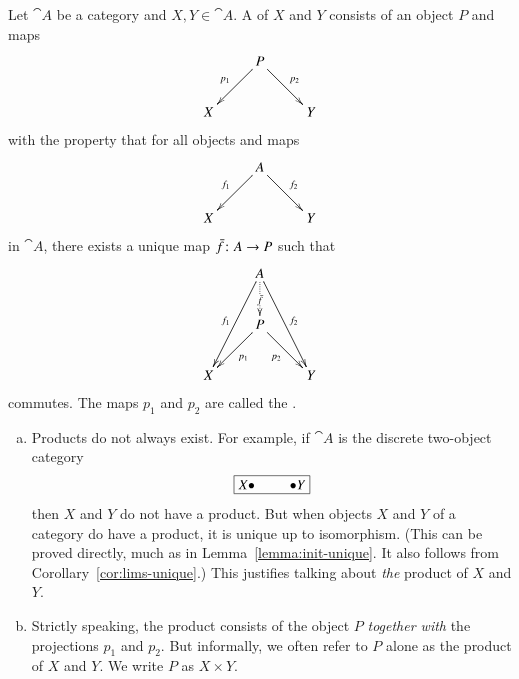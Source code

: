 \begin{defn}
\label{defn:bin-prod}
Let $\cat{A}$ be a category and $X, Y \in \cat{A}$.  A %
%
%
of $X$ and $Y$ consists of an object $P$ and maps
\[
\xymatrix{
        &P \ar[ld]_{p_1} \ar[rd]^{p_2}  &       \\
X       &                               &Y
}
\]
with the property that for all objects and maps
%
\begin{equation}
\label{eq:bin-prod-cone}
\begin{array}{c}
\xymatrix{
        &A \ar[ld]_{f_1} \ar[rd]^{f_2}  &       \\
X       &                               &Y
}
\end{array}
\end{equation}
%
in $\cat{A}$, there exists a unique map $\bar{f}\from A \to P$ such that
%
\begin{equation}
\label{eq:bin-prod-lim}
\begin{array}{c}
\xymatrix{
        &A \ar[ldd]_{f_1} \ar@{.>}[d]|{\bar{f}\vphantom{\bar{\bar{f}}}}
\ar[rdd]^{f_2}&       \\
        &P \ar[ld]^{p_1} \ar[rd]_{p_2}                  &       \\
X       &                                               &Y
}
\end{array}
\end{equation}
%
commutes.  The maps $p_1$ and $p_2$ are called the .%
%
%
\end{defn}

\begin{remarks}
\label{rmks:prod}
\begin{enumerate}[(b)]
\item
\label{rmks:prod:exist}
Products do not always exist.  For example, if $\cat{A}$ is the discrete
two-object category
\[
\fbox{$X\bullet$ \hspace*{2em} $\bullet Y$}
\]
then $X$ and $Y$ do not have a product.  But when objects $X$ and $Y$ of a
category do have a product, it is unique%
%
%
up to isomorphism.  (This can be proved directly, much as in
Lemma~\ref{lemma:init-unique}.  It also follows from
Corollary~\ref{cor:lims-unique}.)  This justifies talking about \emph{the}
product of $X$ and $Y$.

\item
Strictly speaking, the product consists of the object $P$ \emph{together
  with} the projections $p_1$ and $p_2$.  But informally,%
%
%
we often refer to $P$ alone as the product of $X$ and $Y$.  We write $P$ as
$X \times Y$.%
%
%
\end{enumerate}
\end{remarks}


